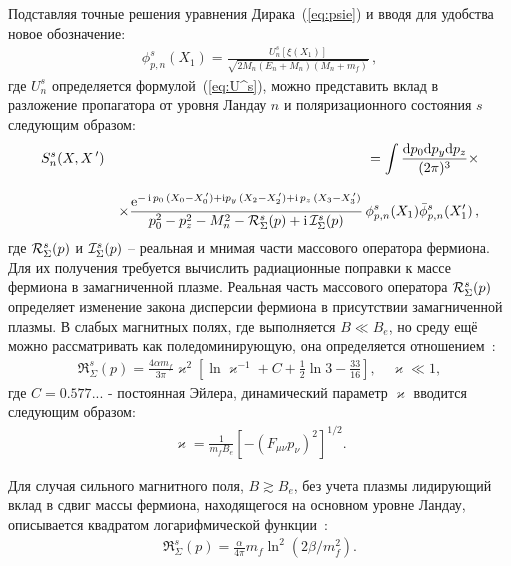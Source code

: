 Подставляя точные решения уравнения Дирака~(\ref{eq:psie}) и вводя для удобства новое обозначение:
\begin{eqnarray}
\phi^{s}_{p, n} (X_1) =   \frac{U^s_{n} [\xi(X_1)]}
{\sqrt{2 M_n (E_{n} + M_n)(M_n + m_f)}} \, ,
\label{eq:phi_psi}
\end{eqnarray}
%
\noindent где $U^s_{n}$ определяется формулой~(\ref{eq:U^s}), можно представить вклад в разложение пропагатора от уровня Ландау $n$ и поляризационного состояния $s$ следующим образом:
\begin{eqnarray}
\label{eq:propagator}
S^{s}_n (X, X^{\,\prime}) && =  \int \frac{\mathrm{d} p_0 \mathrm{d} p_y \mathrm{d} p_z}{(2\pi)^3} \times
\\[3mm]
\nonumber
&& \times \frac{\mathrm{e}^{- \, \mathrm{i} \,  p_0 \,(X_0 - X^{\,\prime}_0) + 
		\mathrm{i} p_y \,(X_2 - X^{\,\prime}_2) +  \mathrm{i} \,  p_z \,(X_3 - X^{\,\prime}_3)}}
{p_0^2 - p_z^2 - M_n^2 - {\cal R}^{s}_\Sigma (p) + \mathrm{i}\, {\cal I}^{s}_\Sigma (p)}
\, \phi^{s}_{p, n} (X_1) \bar \phi^{s}_{p, n} (X'_1) \, ,
\end{eqnarray}
где ${\cal R}^{s}_\Sigma (p)$ и ${\cal I}^{s}_\Sigma (p)$ -- реальная и мнимая части массового оператора фермиона.  Для их получения требуется вычислить радиационные поправки к массе фермиона в замагниченной плазме. Реальная часть массового оператора ${\cal R}^{s}_\Sigma (p)$ определяет изменение закона дисперсии фермиона в присутствии замагниченной плазмы. В слабых магнитных полях, где выполняется $B\ll B_e$, но среду ещё можно рассматривать как поледоминирующую, она определяется 
отношением~\cite{Ritus1969}:
%
\begin{eqnarray}
\label{eq:Re1}
\Re^{s}_\Sigma (p) = \frac{4\alpha m_f}{3\pi} \varkappa^2 \left [ \ln \varkappa^{-1} + C + \frac{1}{2} \ln 3 - \frac{33}{16} \right],\quad \varkappa\ll 1,
\end{eqnarray}
\noindent где $C = 0.577...$ - постоянная Эйлера, динамический параметр $\varkappa$ вводится следующим образом:
%
\begin{eqnarray}
\varkappa = \frac{1}{m_f B_e} [-(F_{\mu\nu} p_{\nu})^2]^{1/2}.
\end{eqnarray}
%

Для случая сильного магнитного поля, $B\gtrsim B_e$, без учета плазмы лидирующий вклад в  сдвиг массы фермиона, находящегося на основном уровне Ландау, описывается квадратом логарифмической функции~\cite{Jancovici:1969}:
\begin{eqnarray}
\label{eq:Re2}
\Re^{s}_\Sigma (p) = \frac{\alpha}{4\pi} m_f \ln^2 (2\beta/m_f^2).
\end{eqnarray}
%

